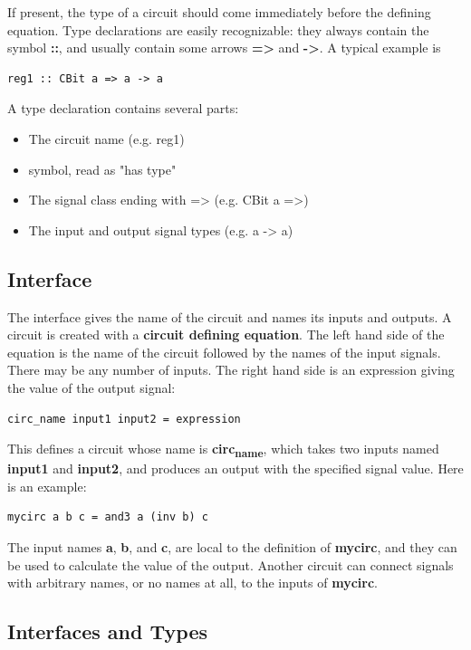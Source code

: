 \documentclass[]{svmono}
\begin{document}
If present, the type of a circuit should come immediately before
the defining equation.  Type declarations are easily recognizable:
they always contain the symbol \textbf{::}, and usually contain some
arrows \textbf{=>} and \textbf{->}.  A typical example is

\begin{verbatim}
reg1 :: CBit a => a -> a
\end{verbatim}

A type declaration contains several parts:

\begin{itemize}
\item The circuit name (e.g. reg1)
\item[{The}] symbol, read as "has type"
\item The signal class ending with => (e.g. CBit a =>)
\item The input and output signal types (e.g. a -> a)
\end{itemize}
\subsection*{Interface}
\label{sec:org3477482}

The interface gives the name of the circuit and names its inputs
and outputs.  A circuit is created with a \textbf{circuit defining
equation}.  The left hand side of the equation is the name of the
circuit followed by the names of the input signals.  There may be
any number of inputs.  The right hand side is an expression giving
the value of the output signal:

\begin{verbatim}
circ_name input1 input2 = expression
\end{verbatim}

This defines a circuit whose name is \textbf{circ\textsubscript{name}}, which takes two
inputs named \textbf{input1} and \textbf{input2}, and produces an output with
the specified signal value.  Here is an example:

\begin{verbatim}
mycirc a b c = and3 a (inv b) c
\end{verbatim}

The input names \textbf{a}, \textbf{b}, and \textbf{c}, are local to the definition of
\textbf{mycirc}, and they can be used to calculate the value of the
output.  Another circuit can connect signals with arbitrary names,
or no names at all, to the inputs of \textbf{mycirc}.
\subsection*{Interfaces and Types}
\label{sec:orgd4a793c}
\end{document}
